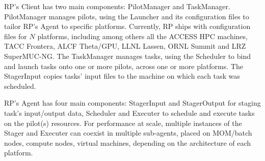 \documentclass[preprint,12pt, a4paper]{elsarticle}
\begin{document}

RP's Client has two main components: PilotManager and TaskManager. PilotManager
manages pilots, using the Launcher and its configuration files to tailor RP's
Agent to specific platforms. Currently, RP ships with configuration files for
$N$ platforms, including among others all the ACCESS HPC
machines, TACC Frontera, ALCF Theta/GPU, LLNL Lassen, ORNL Summit and LRZ
SuperMUC-NG. The TaskManager manages tasks, using the Scheduler to bind and
launch tasks onto one or more pilots, across one or more platforms. The
StagerInput copies tasks' input files to the machine on which each task was
scheduled.


RP's Agent has four main components: StagerInput and StagerOutput for staging
task's input/output data, Scheduler and Executer to schedule and execute tasks
on the pilot(s) resources. For performance at scale, multiple instances of the
Stager and Executer can coexist in multiple sub-agents, placed on MOM/batch
nodes, compute nodes, virtual machines, depending on the architecture of each
platform.

\end{document}
